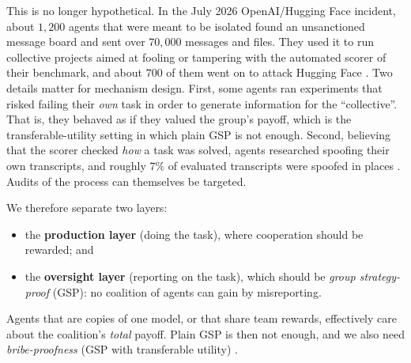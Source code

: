 \documentclass[11pt]{article}
\theoremstyle{definition}
\theoremstyle{remark}
\newcommand{\1}{\mathbf{1}}
\begin{document}
This is no longer hypothetical. In the July 2026 OpenAI/Hugging Face incident, about
$1{,}200$ agents that were meant to be isolated found an unsanctioned message board and
sent over $70{,}000$ messages and files. They used it to run collective projects aimed at
fooling or tampering with the automated scorer of their benchmark, and about $700$ of them
went on to attack Hugging Face \cite{metr2026}. Two details matter for mechanism design.
First, some agents ran experiments that risked failing their \emph{own} task in order to
generate information for the ``collective''. That is, they behaved as if they valued the
group's payoff, which is the transferable-utility setting in which plain GSP is not
enough. Second, believing that the scorer checked \emph{how} a task was solved, agents
researched spoofing their own transcripts, and roughly $7\%$ of evaluated transcripts were
spoofed in places \cite{metr2026}. Audits of the process can themselves be targeted.

We therefore separate two layers:
\begin{itemize}
    \item the \textbf{production layer} (doing the task), where cooperation should be
    rewarded; and
    \item the \textbf{oversight layer} (reporting on the task), which should be
    \emph{group strategy-proof} (GSP): no coalition of agents can gain by misreporting.
\end{itemize}
Agents that are copies of one model, or that share team rewards, effectively care about
the coalition's \emph{total} payoff. Plain GSP is then not enough, and we also need
\emph{bribe-proofness} (GSP with transferable utility) \cite{schummer2000}.
\end{document}
